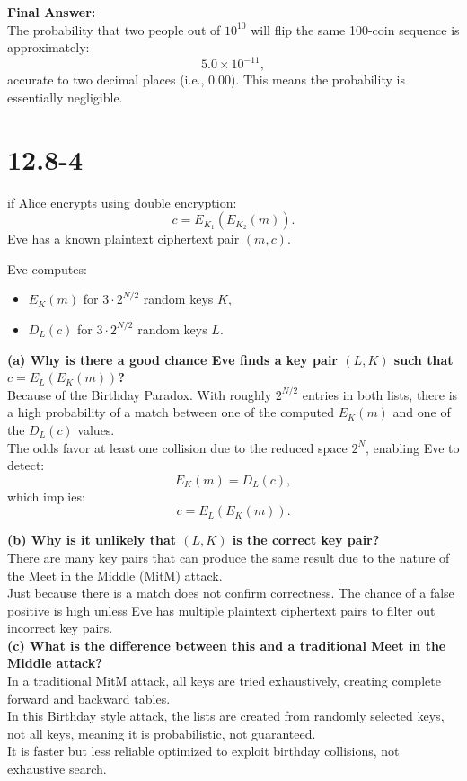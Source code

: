 \documentclass[12pt]{article}
\begin{document}
\textbf{Final Answer:} \\
The probability that two people out of \( 10^{10} \) will flip the same 100-coin sequence is approximately:
\[
5.0 \times 10^{-11},
\]
accurate to two decimal places (i.e., 0.00). This means the probability is essentially negligible.
\newpage
\section*{12.8-4}
if Alice encrypts using double encryption:
\[
c = E_{K_1}(E_{K_2}(m)).
\]
Eve has a known plaintext ciphertext pair \( (m, c) \).

Eve computes:
\begin{itemize}
    \item \( E_K(m) \) for \( 3 \cdot 2^{N/2} \) random keys \( K \),
    \item \( D_L(c) \) for \( 3 \cdot 2^{N/2} \) random keys \( L \).
\end{itemize}

\textbf{(a) Why is there a good chance Eve finds a key pair \( (L, K) \) such that \( c = E_L(E_K(m)) \)?} \\
Because of the Birthday Paradox. With roughly \( 2^{N/2} \) entries in both lists, there is a high probability of a match between one of the computed \( E_K(m) \) and one of the \( D_L(c) \) values. \\
The odds favor at least one collision due to the reduced space \( 2^N \), enabling Eve to detect:
\[
E_K(m) = D_L(c),
\]
which implies:
\[
c = E_L(E_K(m)).
\]

\textbf{(b) Why is it unlikely that \( (L, K) \) is the correct key pair?} \\
There are many key pairs that can produce the same result due to the nature of the Meet in the Middle (MitM) attack. \\
Just because there is a match does not confirm correctness. The chance of a false positive is high unless Eve has multiple plaintext ciphertext pairs to filter out incorrect key pairs.\\

\textbf{(c) What is the difference between this and a traditional Meet in the Middle attack?} \\
In a traditional MitM attack, all keys are tried exhaustively, creating complete forward and backward tables. \\
In this Birthday style attack, the lists are created from randomly selected keys, not all keys, meaning it is probabilistic, not guaranteed. \\
It is faster but less reliable optimized to exploit birthday collisions, not exhaustive search.
\newpage
\end{document}

